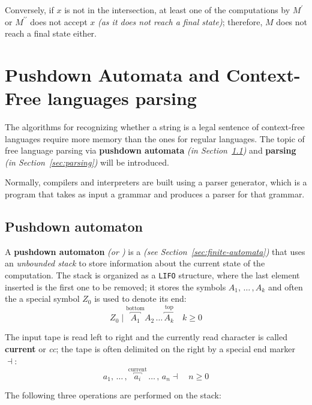 \documentclass[english]{article}
\begin{document}
Conversely, if \(x\) is not in the intersection, at least one of the computations by \(M^\prime\) or \(M^{\prime\prime}\) does not accept \(x\) \textit{(as it does not reach a final state)};
therefore, \(M\) does not reach a final state either.

\clearpage

\section{Pushdown Automata and Context-Free languages parsing}

The algorithms for recognizing whether a string is a legal sentence of context-free languages require more memory than the ones for regular languages.
The topic of free language parsing via \textbf{pushdown automata} \textit{(in Section~\ref{sec:pushdown-automaton})} and \textbf{parsing} \textit{(in Section~\ref{sec:parsing})} will be introduced.

Normally, compilers and interpreters are built using a parser generator, which is a program that takes as input a grammar and produces a parser for that grammar.

\subsection{Pushdown automaton}
\label{sec:pushdown-automaton}

A \textbf{pushdown automaton} \textit{(or \PDA)} is a \FSA \textit{(see Section~\ref{sec:finite-automata})} that uses an \textit{unbounded stack} to store information about the current state of the computation.
The stack is organized as a \texttt{LIFO} structure, where the last element inserted is the first one to be removed;
it stores the symbols \(A_1, \,\ldots\, , A_k\) and often the a special symbol \(Z_0\) is used to denote its end:
\[ Z_0 \mid \overbracket{A_1}^\text{bottom} A_2 \,\ldots\, \overbracket{A_k}^\text{top} \quad k \geq 0\]

The input tape is read left to right and the currently read character is called \textbf{current} or \textit{cc};
the tape is often delimited on the right by a special end marker \(\dashv\):
\[ a_1, \,\ldots\, , \overbracket{a_i}^{\text{current}} \,\ldots\, , \, a_n \dashv \quad n \geq 0 \]

The following three operations are performed on the stack:
\end{document}
